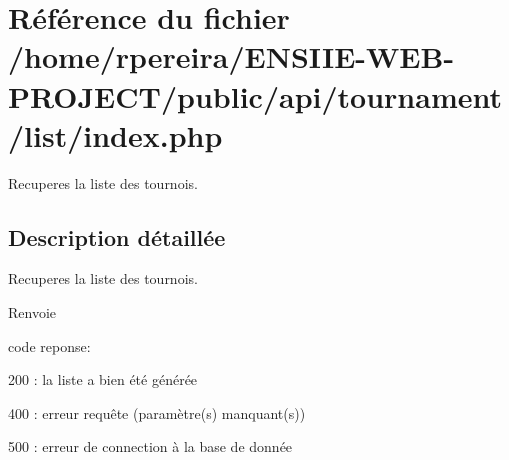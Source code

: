 \hypertarget{tournament_2list_2index_8php}{}\section{Référence du fichier /home/rpereira/\+E\+N\+S\+I\+I\+E-\/\+W\+E\+B-\/\+P\+R\+O\+J\+E\+C\+T/public/api/tournament/list/index.php}
\label{tournament_2list_2index_8php}


Recuperes la liste des tournois.  




\subsection{Description détaillée}
Recuperes la liste des tournois. 

\begin{DoxyReturn}{Renvoie}

\begin{DoxyItemize}
\item code reponse\+:
\begin{DoxyItemize}
\item 200 \+: la liste a bien été générée
\item 400 \+: erreur requête (paramètre(s) manquant(s))
\end{DoxyItemize}
\end{DoxyItemize}
\end{DoxyReturn}

\begin{DoxyItemize}
\item 500 \+: erreur de connection à la base de donnée 
\end{DoxyItemize}